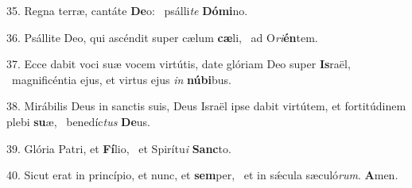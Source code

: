 35. Regna terræ, cantáte \textbf{De}o: \ast\  psálli\textit{te} \textbf{Dó}\textbf{mi}no.\

36. Psállite Deo, qui ascéndit super cælum \textbf{cæ}li, \ast\  ad O\textit{ri}\textbf{én}tem.\

37. Ecce dabit voci suæ vocem virtútis, date glóriam Deo super \textbf{Is}raël, \ast\  magnificéntia ejus, et virtus ejus \textit{in} \textbf{nú}\textbf{bi}bus.\

38. Mirábilis Deus in sanctis suis, Deus Israël ipse dabit virtútem, et fortitúdinem plebi \textbf{su}æ, \ast\  benedíc\textit{tus} \textbf{De}us.\

39. Glória Patri, et \textbf{Fí}lio, \ast\  et Spirítu\textit{i} \textbf{Sanc}to.\

40. Sicut erat in princípio, et nunc, et \textbf{sem}per, \ast\  et in sǽcula sæculó\textit{rum}. \textbf{A}men.\

